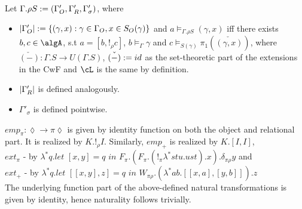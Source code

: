 \documentclass[12pt,a4paper]{article}
\renewcommand{\O}{_{O}}
\newcommand{\R}{\ensuremath{_{R}}}
\begin{document}
Let $\Gamma . \rho S \define (\Gamma'\O, \Gamma'\R, \Gamma'_\sigma)$, where
\begin{itemize}
  \item $\carr{\Gamma'\O} \define \{(\gamma, x) : \gamma \in \Gamma\O, x \in S\O(\gamma) \}$ and $ a \vDash_{\Gamma. \rho S} (\gamma, x)$ iff there exists $b, c \in \algA$, s.t $a = [b, !_\rho c]$, $b \vDash_{\Gamma} \gamma$ and $c \vDash_{S(\gamma)} \pi_1(\check{(\gamma, x)}) $, where $\check{(-)} : \Gamma . S \to U(\Gamma . S)$, $\check{(-)} := id$ as the set-theoretic part of the extensions in the CwF and $\cL$ is the same by definition.
  
  \item $\carr{\Gamma'\R}$ is defined analogously. 
  
  \item $\Gamma'_\sigma$ is defined pointwise.
\end{itemize}
            
$emp_\pi : \lozenge \to \pi \lozenge$ is given by identity function on both the object and relational part. It is realized by $K. !_\rho I$. Similarly, $emp_+$ is realized by $K . [I, I]$,\\
$ext_\pi$ - by $\lambda^* q. \textit{let }[x, y] = q\textit{ in } F_\pi . (F_\pi. (!_\pi \lambda^* s t u. u s t) . x) . \delta_{\pi \rho} y$ and \\
$ext_+$ - by $\lambda^* q. \textit{let } [[x , y], z] = q \textit{ in } W_{\pi\rho}.(\lambda^* a b. [[x, a],  [y, b]]).z$\\

The underlying function part of the above-defined natural transformations is given by identity, hence naturality follows trivially.

%
%
%
\end{document}
